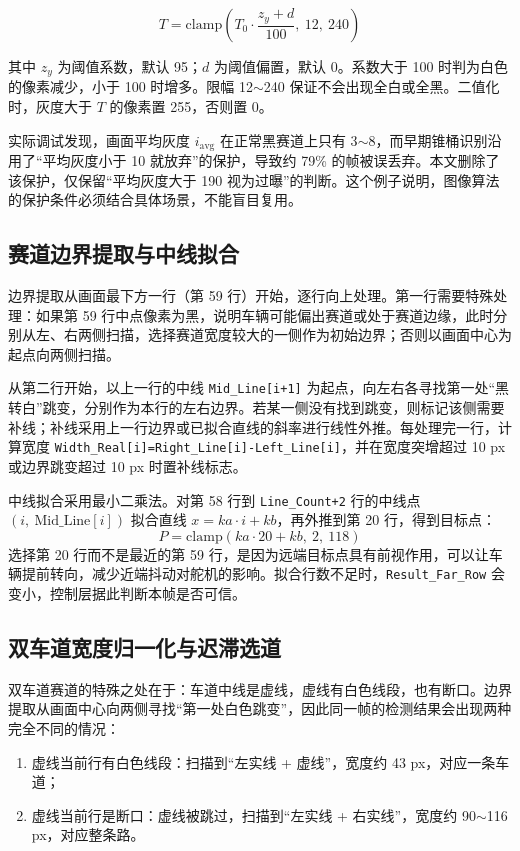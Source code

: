 \documentclass{MaiTechReport}
\begin{document}
\begin{equation}
  T=\mathrm{clamp}\left(T_0\cdot\frac{z_y+d}{100},\ 12,\ 240\right)
  \label{eq:threshold}
\end{equation}

其中 $z_y$ 为阈值系数，默认 95；$d$ 为阈值偏置，默认 0。系数大于 100 时判为白色的像素减少，小于 100 时增多。限幅 12$\sim$240 保证不会出现全白或全黑。二值化时，灰度大于 $T$ 的像素置 255，否则置 0。

实际调试发现，画面平均灰度 $i_{\mathrm{avg}}$ 在正常黑赛道上只有 3$\sim$8，而早期锥桶识别沿用了“平均灰度小于 10 就放弃”的保护，导致约 79\% 的帧被误丢弃。本文删除了该保护，仅保留“平均灰度大于 190 视为过曝”的判断。这个例子说明，图像算法的保护条件必须结合具体场景，不能盲目复用。

\subsection{赛道边界提取与中线拟合}
边界提取从画面最下方一行（第 59 行）开始，逐行向上处理。第一行需要特殊处理：如果第 59 行中点像素为黑，说明车辆可能偏出赛道或处于赛道边缘，此时分别从左、右两侧扫描，选择赛道宽度较大的一侧作为初始边界；否则以画面中心为起点向两侧扫描。

从第二行开始，以上一行的中线 \texttt{Mid\_Line[i+1]} 为起点，向左右各寻找第一处“黑转白”跳变，分别作为本行的左右边界。若某一侧没有找到跳变，则标记该侧需要补线；补线采用上一行边界或已拟合直线的斜率进行线性外推。每处理完一行，计算宽度 \texttt{Width\_Real[i]=Right\_Line[i]-Left\_Line[i]}，并在宽度突增超过 10 px 或边界跳变超过 10 px 时置补线标志。

中线拟合采用最小二乘法。对第 58 行到 \texttt{Line\_Count+2} 行的中线点 $(i,\ \mathrm{Mid\_Line}[i])$ 拟合直线 $x=ka\cdot i+kb$，再外推到第 20 行，得到目标点：
\begin{equation}
  P = \mathrm{clamp}\left(ka\cdot 20+kb,\ 2,\ 118\right)
  \label{eq:point}
\end{equation}
选择第 20 行而不是最近的第 59 行，是因为远端目标点具有前视作用，可以让车辆提前转向，减少近端抖动对舵机的影响。拟合行数不足时，\texttt{Result\_Far\_Row} 会变小，控制层据此判断本帧是否可信。

\subsection{双车道宽度归一化与迟滞选道}
双车道赛道的特殊之处在于：车道中线是虚线，虚线有白色线段，也有断口。边界提取从画面中心向两侧寻找“第一处白色跳变”，因此同一帧的检测结果会出现两种完全不同的情况：
\begin{enumerate}
  \item 虚线当前行有白色线段：扫描到“左实线 + 虚线”，宽度约 43 px，对应一条车道；
  \item 虚线当前行是断口：虚线被跳过，扫描到“左实线 + 右实线”，宽度约 90$\sim$116 px，对应整条路。
\end{enumerate}
\end{document}
